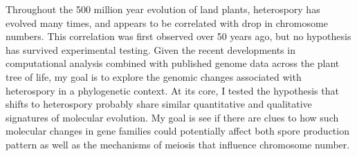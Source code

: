 \doublespacing
Throughout the 500 million year evolution of land plants, heterospory has evolved many times, and appears to be correlated with drop in chromosome numbers. This correlation was first observed over 50 years ago, but no hypothesis has survived experimental testing. Given the recent developments in computational analysis combined with published genome data across the plant tree of life, my goal is to explore the genomic changes associated with heterospory in a phylogenetic context. At its core, I tested the hypothesis that shifts to  heterospory probably share similar quantitative and qualitative signatures of molecular evolution. My goal is see if there are clues to how such molecular changes in gene families could potentially affect both spore production pattern as well as the mechanisms of meiosis that influence chromosome number.
\clearpage

